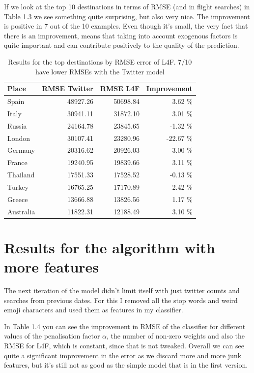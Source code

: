 \documentclass[minf,frontabs,twoside,singlespacing,parskip]{infthesis}
\begin{document}
If we look at the top 10 destinations in terms of RMSE (and in flight searches) in Table 1.3 we see something quite surprising, but also very nice. The improvement is positive in 7 out of the 10 examples. Even though it's small, the very fact that there is an improvement, means that taking into account exogenous factors is quite important and can contribute positively to the quality of the prediction.


\begin{table}[]
\begin{center}
\begin{tabular}{ l | r | r | r}
Place & RMSE Twitter & RMSE L4F & Improvement \\
\hline
Spain & 48927.26 & 50698.84 & 3.62 \% \\ 
Italy & 30941.11 & 31872.10 & 3.01 \% \\ 
Russia & 24164.78 & 23845.65 & -1.32 \% \\ 
London & 30107.41 & 23280.96 & -22.67 \% \\ 
Germany & 20316.62 & 20926.03 & 3.00 \% \\ 
France & 19240.95 & 19839.66 & 3.11 \% \\ 
Thailand & 17551.33 & 17528.52 & -0.13 \% \\ 
Turkey & 16765.25 & 17170.89 & 2.42 \% \\ 
Greece & 13666.88 & 13826.56 & 1.17 \% \\ 
Australia & 11822.31 & 12188.49 & 3.10 \% \\
\end{tabular}
\end{center}
\caption{Results for the top destinations by RMSE error of L4F. 7/10 have lower RMSEs with the Twitter model}
\end{table}


\section{Results for the algorithm with more features}

The next iteration of the model didn't limit itself with just twitter counts and searches from previous dates. For this I removed all the stop words and weird emoji characters and used them as features in my classifier. 

In Table 1.4 you can see the improvement in RMSE of the classifier for different values of the penalisation factor $\alpha$, the number of non-zero weights and also the RMSE for L4F, which is constant, since that is not tweaked. Overall we can see quite a significant improvement in the error as we discard more and more junk features, but it's still not as good as the simple model that is in the first version. 
\end{document}
